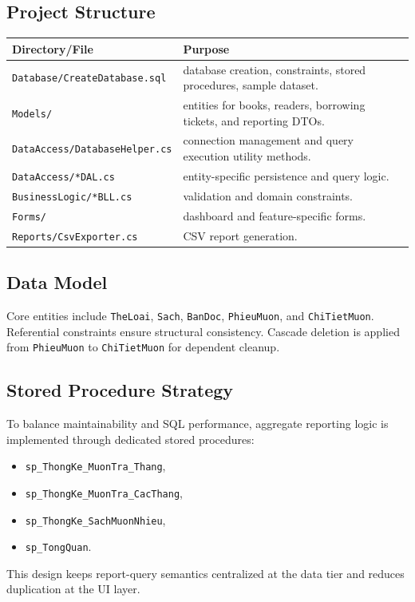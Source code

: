 \documentclass[12pt,a4paper]{article}
\begin{document}
\subsection{Project Structure}
\begin{longtable}{p{4.1cm}p{10.5cm}}
\toprule
\textbf{Directory/File} & \textbf{Purpose} \\
\midrule
\endhead
\texttt{Database/CreateDatabase.sql} & database creation, constraints, stored procedures, sample dataset. \\
\texttt{Models/} & entities for books, readers, borrowing tickets, and reporting DTOs. \\
\texttt{DataAccess/DatabaseHelper.cs} & connection management and query execution utility methods. \\
\texttt{DataAccess/*DAL.cs} & entity-specific persistence and query logic. \\
\texttt{BusinessLogic/*BLL.cs} & validation and domain constraints. \\
\texttt{Forms/} & dashboard and feature-specific forms. \\
\texttt{Reports/CsvExporter.cs} & CSV report generation. \\
\bottomrule
\end{longtable}

\subsection{Data Model}
Core entities include \texttt{TheLoai}, \texttt{Sach}, \texttt{BanDoc}, \texttt{PhieuMuon}, and \texttt{ChiTietMuon}. Referential constraints ensure structural consistency. Cascade deletion is applied from \texttt{PhieuMuon} to \texttt{ChiTietMuon} for dependent cleanup.

\subsection{Stored Procedure Strategy}
To balance maintainability and SQL performance, aggregate reporting logic is implemented through dedicated stored procedures:
\begin{itemize}[leftmargin=1.5cm]
    \item \texttt{sp\_ThongKe\_MuonTra\_Thang},
    \item \texttt{sp\_ThongKe\_MuonTra\_CacThang},
    \item \texttt{sp\_ThongKe\_SachMuonNhieu},
    \item \texttt{sp\_TongQuan}.
\end{itemize}
This design keeps report-query semantics centralized at the data tier and reduces duplication at the UI layer.
\end{document}
